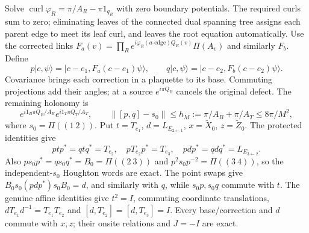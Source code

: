 Solve $\operatorname{curl}\varphi_R=\pi/A_R-\pi1_{q_R}$ with zero boundary potentials. The required curls sum to zero; eliminating leaves of the connected dual spanning tree assigns each parent edge to meet its leaf curl, and leaves the root equation automatically. Use the corrected links
$F_a(v)=\prod_R e^{i\varphi_R(a\text{-edge})Q_R(v)}\Pi(A_v)$ and similarly $F_b$. Define
\[
 p|c,\psi\rangle=|c-e_1,F_a(c-e_1)\psi\rangle,\qquad
 q|c,\psi\rangle=|c-e_2,F_b(c-e_2)\psi\rangle.
\]
Covariance brings each correction in a plaquette to its base. Commuting projections add their angles; at a source $e^{i\pi Q_R}$ cancels the original defect. The remaining holonomy is
\[
 e^{i1_B\pi Q_B/A_B}e^{i1_T\pi Q_T/A_T},\qquad
 \|[p,q]-s_0\|\le h_M:=\pi/A_B+\pi/A_T\le8\pi/M^2,
\]
where $s_0=\Pi((1\ 2))$. Put $t=T_{e_1}$, $d=L_{E_{2\leftarrow1}}$, $x=\widetilde X_0$, $z=\widetilde Z_0$.
The protected identities give
\[
 ptp^*=qtq^*=T_{e_2},\quad pT_{e_2}p^*=T_{e_3},\quad
 pdp^*=qdq^*=L_{E_{3\leftarrow2}}.
\]
Also $ps_0p^*=qs_0q^*=B_0=\Pi((2\ 3))$ and $p^2s_0p^{-2}=\Pi((3\ 4))$, so the independent-$s_0$ Houghton words are exact. The point swaps give $B_0s_0(pdp^*)s_0B_0=d$, and similarly with $q$, while $s_0p,s_0q$ commute with $t$.
The genuine affine identities give $t^2=I$, commuting coordinate translations,
$dT_{e_1}d^{-1}=T_{e_1}T_{e_2}$ and $[d,T_{e_2}]=[d,T_{e_3}]=I$. Every base/correction and $d$ commute with $x,z$; their onsite relations and $J=-I$ are exact.

